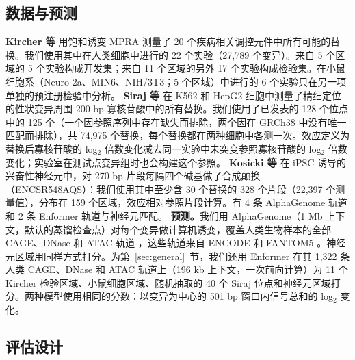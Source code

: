 \documentclass[webpdf,contemporary,large]{oup-authoring-template}
\begin{document}
\subsection{数据与预测}

\textbf{Kircher 等} \citep{kircher2019saturation} 用饱和诱变 MPRA 测量了 20 个疾病相关调控元件中所有可能的替换。我们使用其中在人类细胞中进行的 22 个实验（27,789 个变异）。来自 5 个区域的 5 个实验构成开发集；来自 11 个区域的另外 17 个实验构成检验集。在小鼠细胞系（Neuro-2a、MIN6、NIH/3T3；5 个区域）中进行的 6 个实验只在另一项单独的预注册检验中分析。
\textbf{Siraj 等} \citep{siraj2026functional,siraj2025data} 在 K562 和 HepG2 细胞中测量了精细定位的性状变异周围 200 bp 寡核苷酸中的所有替换。我们使用了已发表的 128 个位点中的 125 个（一个因参照序列中存在缺失而排除，两个因在 GRCh38 中没有唯一匹配而排除），共 74,975 个替换，每个替换都在两种细胞中各测一次。效应定义为替换后寡核苷酸的 log$_2$ 倍数变化减去同一实验中未突变参照寡核苷酸的 log$_2$ 倍数变化；实验室在测试点变异组时也会构建这个参照。
\textbf{Kosicki 等} \citep{kosicki2025mpra} 在 iPSC 诱导的兴奋性神经元中，对 270 bp 片段每隔四个碱基做了合成颠换（ENCSR548AQS）：我们使用其中至少含 30 个替换的 328 个片段（22,397 个测量值），分布在 159 个区域，效应相对参照片段计算。有 4 条 AlphaGenome 轨道和 2 条 Enformer 轨道与神经元匹配。
\textbf{预测。}我们用 AlphaGenome（1 Mb 上下文，默认的蒸馏检查点）对每个变异做计算机诱变，覆盖人类生物样本的全部 CAGE、DNase 和 ATAC 轨道 \citep{avsec2026alphagenome}，这些轨道来自 ENCODE 和 FANTOM5 \citep{encode2020expanded,fantom2014atlas}。神经元区域用同样方式打分。为第~\ref{sec:general}~节，我们还用 Enformer \citep{avsec2021enformer} 在其 1,322 条人类 CAGE、DNase 和 ATAC 轨道上（196 kb 上下文，一次前向计算）为 11 个 Kircher 检验区域、小鼠细胞区域、随机抽取的 40 个 Siraj 位点和神经元区域打分。两种模型使用相同的分数：以变异为中心的 501 bp 窗口内信号总和的 log$_2$ 变化。

\subsection{评估设计}
\label{sec:eval}
\end{document}
